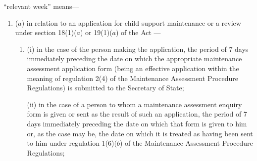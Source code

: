 \documentclass[12pt,a4paper]{article}
\begin{document}
\begin{enumerate}
%
%

“relevant week” means---
\begin{enumerate}\item[]
($a$) in relation to an application for child support maintenance
or a review under section 18(1)($a$) or 19(1)($a$) of the Act%
---
\begin{enumerate}\item[]
(i) in the case of the person making the application, the period of 7 days immediately preceding the date on which the appropriate maintenance assessment application form (being an effective application within the meaning of regulation 2(4) of the Maintenance Assessment Procedure Regulations) is submitted to the Secretary of State;

(ii) in the case of a person to whom a maintenance assessment enquiry form is given or sent as the result of such an application, the period of 7 days immediately preceding the date on which that form is given to him or, as the case may be, the date on which it is treated as having been sent to him under regulation 1(6)($b$) of the Maintenance Assessment Procedure Regulations;
\end{enumerate}


\end{enumerate}
\end{enumerate}
\end{document}
